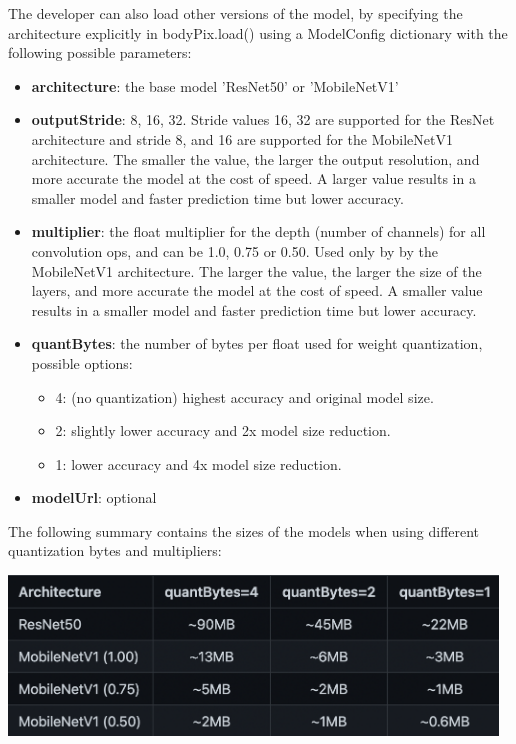 \documentclass[runningheads,a4paper,11pt]{report}
\begin{document}
The developer can also load other versions of the model, by specifying the architecture explicitly in bodyPix.load() using a ModelConfig dictionary with the following possible parameters:
\begin{itemize}
    \item \textbf{architecture}: the base model 'ResNet50' or 'MobileNetV1'
    \item \textbf{outputStride}: 8, 16, 32. Stride values 16, 32 are supported for the ResNet architecture and stride 8, and 16 are supported for the MobileNetV1 architecture. The smaller the value, the larger the output resolution, and more accurate the model at the cost of speed. A larger value results in a smaller model and faster prediction time but lower accuracy.
    \item \textbf{multiplier}: the float multiplier for the depth (number of channels) for all convolution ops, and can be 1.0, 0.75 or 0.50. Used only by by the MobileNetV1 architecture. The larger the value, the larger the size of the layers, and more accurate the model at the cost of speed. A smaller value results in a smaller model and faster prediction time but lower accuracy.
    \item \textbf{quantBytes}: the number of bytes per float used for weight quantization, possible options:
    \begin{itemize}
        \item 4: (no quantization) highest accuracy and original model size.
        \item 2: slightly lower accuracy and 2x model size reduction.
        \item 1: lower accuracy and 4x model size reduction.
    \end{itemize}
    \item \textbf{modelUrl}: optional
\end{itemize}
The following summary contains the sizes of the models when using different quantization bytes and multipliers:

\begin{center}
\includegraphics[width=13cm]{images/architectureTable.png}
\end{center}
\end{document}
